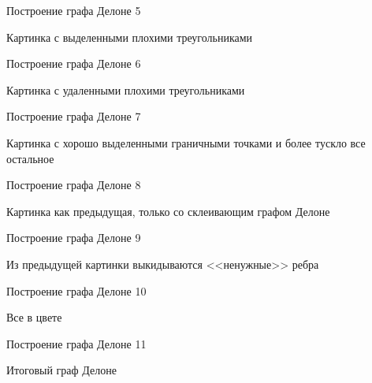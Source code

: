 \documentclass[14pt, fleqn, xcolor={dvipsnames, table}]{beamer}
\begin{document}
        \begin{frame}{Построение графа Делоне 5}
            \begin{center}
                Картинка с выделенными плохими треугольниками
            \end{center}            
        \end{frame}
        
        \begin{frame}{Построение графа Делоне 6}
            \begin{center}
                Картинка с удаленными плохими треугольниками
            \end{center}             
        \end{frame}
        
        \begin{frame}{Построение графа Делоне 7}
            \begin{center}
                Картинка с хорошо выделенными граничными точками и более тускло все остальное
            \end{center}             
        \end{frame}
        
        \begin{frame}{Построение графа Делоне 8}
            \begin{center}
                Картинка как предыдущая, только со склеивающим графом Делоне
            \end{center}             
        \end{frame}    
        
        \begin{frame}{Построение графа Делоне 9}
            \begin{center}
                Из предыдущей картинки выкидываются <<ненужные>> ребра
            \end{center}            
        \end{frame}  
        
        \begin{frame}{Построение графа Делоне 10}
            \begin{center}
                Все в цвете
            \end{center}            
        \end{frame}  
        
        \begin{frame}{Построение графа Делоне 11}
            \begin{center}
                Итоговый граф Делоне
            \end{center}             
        \end{frame} 
        
\end{document}
